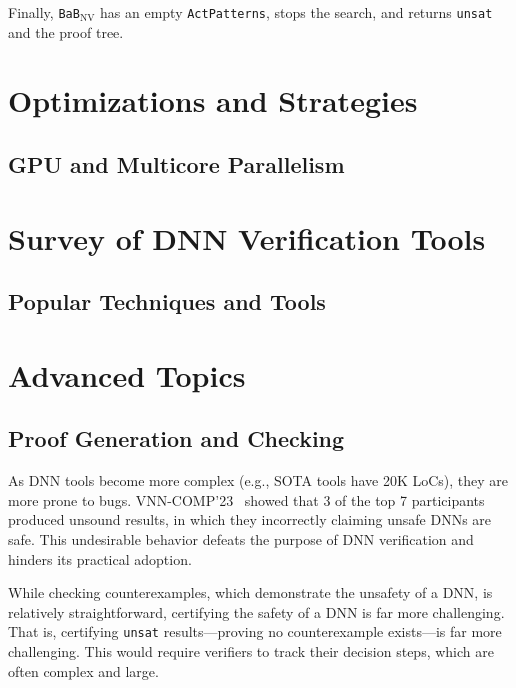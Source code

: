 \documentclass[oneside,11pt,dvipsnames]{book}
\newcommand{\bab}{\texttt{BaB$_{\text{NV}}$}}
\begin{document}
Finally, \bab{} has an empty \texttt{ActPatterns}, stops the search, and returns \texttt{unsat} and the proof tree. 




\part{Optimizations and Strategies}


\chapter{GPU and Multicore Parallelism}


\part{Survey of DNN Verification Tools}

\chapter{Popular Techniques and Tools}




\part{Advanced Topics\label{part:advanced-topics}}




\chapter{Proof Generation and Checking}\label{chapter:proof-gen-check}

As DNN tools become more complex (e.g., SOTA tools have 20K LoCs), they are more prone to bugs. VNN-COMP'23~\cite{brix2023fourth} showed that 3 of the top 7 participants produced unsound results, in which they incorrectly claiming unsafe DNNs are safe. This undesirable behavior defeats the purpose of DNN verification and hinders its practical adoption.

While checking counterexamples, which demonstrate the unsafety of a DNN, is relatively straightforward, certifying the safety of a DNN is far more challenging. That is, certifying \texttt{unsat} results---proving no counterexample exists---is far more challenging. This would require verifiers to track their decision steps, which are often complex and large. %
\end{document}
